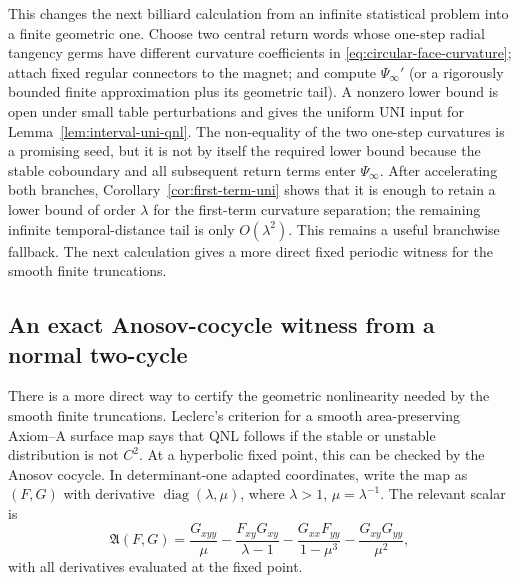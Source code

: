 \documentclass[11pt]{article}
\begin{document}
This changes the next billiard calculation from an infinite statistical
problem into a finite geometric one.  Choose two central return words whose
one-step radial tangency germs have different curvature coefficients in
\eqref{eq:circular-face-curvature}; attach fixed regular connectors to the
magnet; and compute $\Psi_\infty'$ (or a rigorously bounded finite
approximation plus its geometric tail).  A nonzero lower bound is open under
small table perturbations and gives the uniform UNI input for
Lemma~\ref{lem:interval-uni-qnl}.  The non-equality of the two one-step
curvatures is a promising seed, but it is not by itself the required lower
bound because the stable coboundary and all subsequent return terms enter
$\Psi_\infty$.
After accelerating both branches, Corollary~\ref{cor:first-term-uni} shows
that it is enough to retain a lower bound of order $\lambda$ for the
first-term curvature separation; the remaining infinite temporal-distance
tail is only $O(\lambda^2)$.  This remains a useful branchwise fallback.  The
next calculation gives a more direct fixed periodic witness for the smooth
finite truncations.

\subsection{An exact Anosov-cocycle witness from a normal two-cycle}

There is a more direct way to certify the geometric nonlinearity needed by
the smooth finite truncations.  Leclerc's criterion for a smooth
area-preserving Axiom--A surface map says that QNL follows if the stable or
unstable distribution is not $C^2$.  At a hyperbolic fixed point, this can be
checked by the Anosov cocycle.  In determinant-one adapted coordinates, write
the map as $(F,G)$ with derivative
$\operatorname{diag}(\lambda,\mu)$, where $\lambda>1$, $\mu=\lambda^{-1}$.
The relevant scalar is
\begin{equation}
\label{eq:anosov-cocycle}
 \mathfrak A(F,G)
 =\frac{G_{xyy}}{\mu}
 -\frac{F_{xy}G_{xy}}{\lambda-1}
 -\frac{G_{xx}F_{yy}}{1-\mu^3}
 -\frac{G_{xy}G_{yy}}{\mu^2},
\end{equation}
with all derivatives evaluated at the fixed point.
\end{document}
